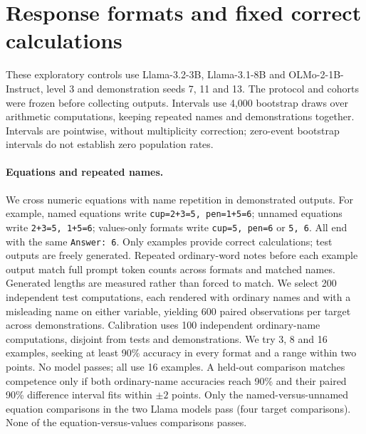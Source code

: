 \section{Response formats and fixed correct calculations}
\label{a-app:round7-controls}
These exploratory controls use Llama-3.2-3B, Llama-3.1-8B and OLMo-2-1B-Instruct, level 3 and demonstration seeds 7, 11 and 13. The protocol and cohorts were frozen before collecting outputs. Intervals use 4,000 bootstrap draws over arithmetic computations, keeping repeated names and demonstrations together. Intervals are pointwise, without multiplicity correction; zero-event bootstrap intervals do not establish zero population rates.
\paragraph{Equations and repeated names.}
We cross numeric equations with name repetition in demonstrated outputs. For example, named equations write \texttt{cup=2+3=5, pen=1+5=6}; unnamed equations write \texttt{2+3=5, 1+5=6}; values-only formats write \texttt{cup=5, pen=6} or \texttt{5, 6}. All end with the same \texttt{Answer: 6}. Only examples provide correct calculations; test outputs are freely generated. Repeated ordinary-word notes before each example output match full prompt token counts across formats and matched names. Generated lengths are measured rather than forced to match.
We select 200 independent test computations, each rendered with ordinary names and with a misleading name on either variable, yielding 600 paired observations per target across demonstrations. Calibration uses 100 independent ordinary-name computations, disjoint from tests and demonstrations. We try 3, 8 and 16 examples, seeking at least 90\% accuracy in every format and a range within two points. No model passes; all use 16 examples. A held-out comparison matches competence only if both ordinary-name accuracies reach 90\% and their paired 90\% difference interval fits within $\pm2$ points. Only the named-versus-unnamed equation comparisons in the two Llama models pass (four target comparisons). None of the equation-versus-values comparisons passes.
